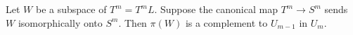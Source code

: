 Let $W$ be a subspace of $T^m = T^mL$. Suppose the canonical map $T^m \to S^m$ sends $W$ isomorphically onto $S^m$. Then $\pi(W)$ is a complement to $U_{m-1}$ in $U_m$.

